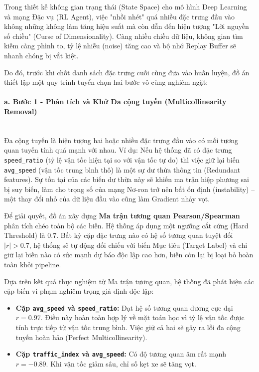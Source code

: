 Trong thiết kế không gian trạng thái (State Space) cho mô hình Deep Learning và mạng Đặc vụ (RL Agent), việc "nhồi nhét" quá nhiều đặc trưng đầu vào không những không làm tăng hiệu suất mà còn dẫn đến hiện tượng "Lời nguyền số chiều" (Curse of Dimensionality). Càng nhiều chiều dữ liệu, không gian tìm kiếm càng phình to, tỷ lệ nhiễu (noise) tăng cao và bộ nhớ Replay Buffer sẽ nhanh chóng bị vắt kiệt.

Do đó, trước khi chốt danh sách đặc trưng cuối cùng đưa vào huấn luyện, đồ án thiết lập một quy trình tuyển chọn hai bước vô cùng nghiêm ngặt:

\paragraph{a. Bước 1 - Phân tích và Khử Đa cộng tuyến (Multicollinearity Removal)} \mbox{} \\
Đa cộng tuyến là hiện tượng hai hoặc nhiều đặc trưng đầu vào có mối tương quan tuyến tính quá mạnh với nhau. Ví dụ: Nếu hệ thống đã có đặc trưng \texttt{speed\_ratio} (tỷ lệ vận tốc hiện tại so với vận tốc tự do) thì việc giữ lại biến \texttt{avg\_speed} (vận tốc trung bình thô) là một sự dư thừa thông tin (Redundant features). Sự tồn tại của các biến dư thừa này sẽ khiến ma trận hiệp phương sai bị suy biến, làm cho trọng số của mạng Nơ-ron trở nên bất ổn định (instability) – một thay đổi nhỏ của dữ liệu đầu vào cũng làm Gradient nhảy vọt.

Để giải quyết, đồ án xây dựng \textbf{Ma trận tương quan Pearson/Spearman} phân tích chéo toàn bộ các biến. Hệ thống áp dụng một ngưỡng cắt cứng (Hard Threshold) là $0.7$. Bất kỳ cặp đặc trưng nào có hệ số tương quan tuyệt đối $|r| > 0.7$, hệ thống sẽ tự động đối chiếu với biến Mục tiêu (Target Label) và chỉ giữ lại biến nào có sức mạnh dự báo độc lập cao hơn, biến còn lại bị loại bỏ hoàn toàn khỏi pipeline.

Dựa trên kết quả thực nghiệm từ Ma trận tương quan, hệ thống đã phát hiện các cặp biến vi phạm nghiêm trọng giả định độc lập:
\begin{itemize}
    \item \textbf{Cặp \texttt{avg\_speed} và \texttt{speed\_ratio}:} Đạt hệ số tương quan dương cực đại $r = 0.97$. Điều này hoàn toàn hợp lý về mặt toán học vì tỷ lệ vận tốc được tính trực tiếp từ vận tốc trung bình. Việc giữ cả hai sẽ gây ra lỗi đa cộng tuyến hoàn hảo (Perfect Multicollinearity).
    \item \textbf{Cặp \texttt{traffic\_index} và \texttt{avg\_speed}:} Có độ tương quan âm rất mạnh $r = -0.89$. Khi vận tốc giảm sâu, chỉ số kẹt xe sẽ tăng vọt.
\end{itemize}

